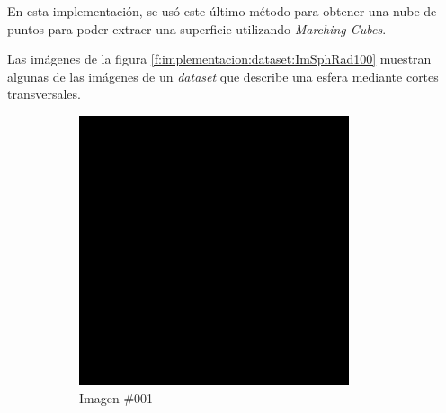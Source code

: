 \pagebreak
En esta implementación, se usó este último método para obtener una nube de puntos para poder extraer una superficie utilizando \emph{Marching Cubes}.

Las imágenes de la figura \ref{f:implementacion:dataset:ImSphRad100} muestran algunas de las imágenes de un \emph{dataset} que describe una esfera mediante cortes transversales.

\begin{figure}
\centering

	\begin{subfigure}{0.30\textwidth}
		\centering
		\includegraphics[width=\textwidth]{images/datasets/ImSphRad100/Sphere001.png}
		\caption{Imagen \#001}
		\label{f:implementacion:ImSphRad100:001}
	\end{subfigure}
	\begin{subfigure}{0.30\textwidth}
		\centering

\end{subfigure}
\end{figure}
